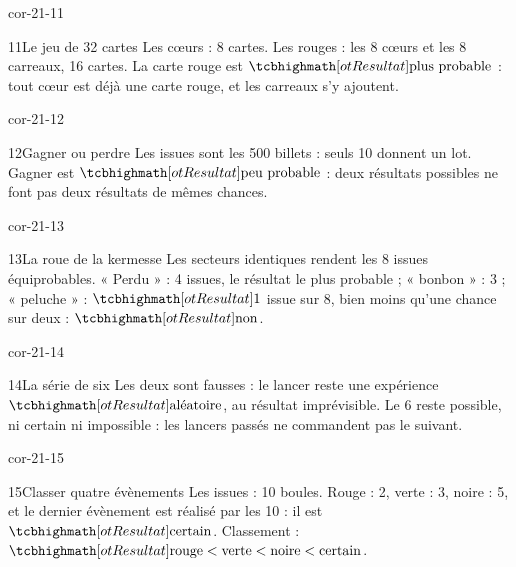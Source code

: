 \begin{blocLivre}{cor-21-11}\begin{corrige}{11}{Le jeu de 32 cartes}
Les cœurs : 8 cartes. Les rouges : les 8 cœurs et les 8 carreaux, 16 cartes. La carte rouge est $\res{\text{plus probable}}$ : tout cœur est déjà une carte rouge, et les carreaux s’y ajoutent.
\end{corrige}\end{blocLivre}
\begin{blocLivre}{cor-21-12}\begin{corrige}{12}{Gagner ou perdre}
Les issues sont les 500 billets : seuls 10 donnent un lot. Gagner est $\res{\text{peu probable}}$ : deux résultats possibles ne font pas deux résultats de mêmes chances.
\end{corrige}\end{blocLivre}
\begin{blocLivre}{cor-21-13}\begin{corrige}{13}{La roue de la kermesse}
Les secteurs identiques rendent les 8 issues équiprobables. « Perdu » : 4 issues, le résultat le plus probable ; « bonbon » : 3 ; « peluche » : $\res1$ issue sur 8, bien moins qu’une chance sur deux : $\res{\text{non}}$.
\label{fig-cor-21-13}
\end{corrige}\end{blocLivre}
\begin{blocLivre}{cor-21-14}\begin{corrige}{14}{La série de six}
Les deux sont fausses : le lancer reste une expérience $\res{\text{aléatoire}}$, au résultat imprévisible. Le 6 reste possible, ni certain ni impossible : les lancers passés ne commandent pas le suivant.
\end{corrige}\end{blocLivre}
\begin{blocLivre}{cor-21-15}\begin{corrige}{15}{Classer quatre évènements}
Les issues : 10 boules. Rouge : 2, verte : 3, noire : 5, et le dernier évènement est réalisé par les 10 : il est $\res{\text{certain}}$. Classement : $\res{\text{rouge}<\text{verte}<\text{noire}<\text{certain}}$.
\label{fig-cor-21-15}
\end{corrige}\end{blocLivre}
